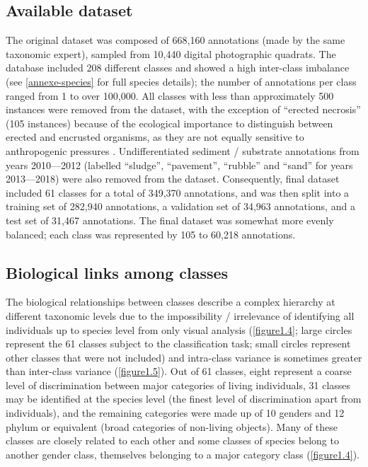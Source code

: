 \subsection{Available dataset}\label{chapitre1_3.2}
The original dataset was composed of 668,160 annotations (made by the same taxonomic expert), sampled from 10,440 digital photographic quadrats. The database included 208 different classes and showed a high inter-class imbalance (see \autoref{annexe-species} for full species details); the number of annotations per class ranged from 1 to over 100,000. All classes with less than approximately 500 instances were removed from the dataset, with the exception of “erected necrosis” (105 instances) because of the ecological importance to distinguish between erected and encrusted organisms, as they are not equally sensitive to anthropogenic pressures \citep{sartoretto_integrated_2017}. Undifferentiated sediment / substrate annotations from years 2010---2012 (labelled “sludge”, “pavement”, “rubble” and “sand” for years 2013---2018) were also removed from the dataset. Consequently, final dataset included 61 classes for a total of 349,370 annotations, and was then split into a training set of 282,940 annotations, a validation set of 34,963 annotations, and a test set of 31,467 annotations. The final dataset was somewhat more evenly balanced; each class was represented by 105 to 60,218 annotations.

\subsection{Biological links among classes }\label{chapitre1_3.3}
The biological relationships between classes describe a complex hierarchy at different taxonomic levels due to the impossibility / irrelevance of identifying all individuals up to species level from only visual analysis (\autoref{figure1.4}; large circles represent the 61 classes subject to the classification task; small circles represent other classes that were not included) and intra-class variance is sometimes greater than inter-class variance (\autoref{figure1.5}). Out of 61 classes, eight represent a coarse level of discrimination between major categories of living individuals, 31 classes may be identified at the species level (the finest level of discrimination apart from individuals), and the remaining categories were made up of 10 genders and 12 phylum or equivalent (broad categories of non-living objects). Many of these classes are closely related to each other and some classes of species belong to another gender class, themselves belonging to a major category class (\autoref{figure1.4}).

